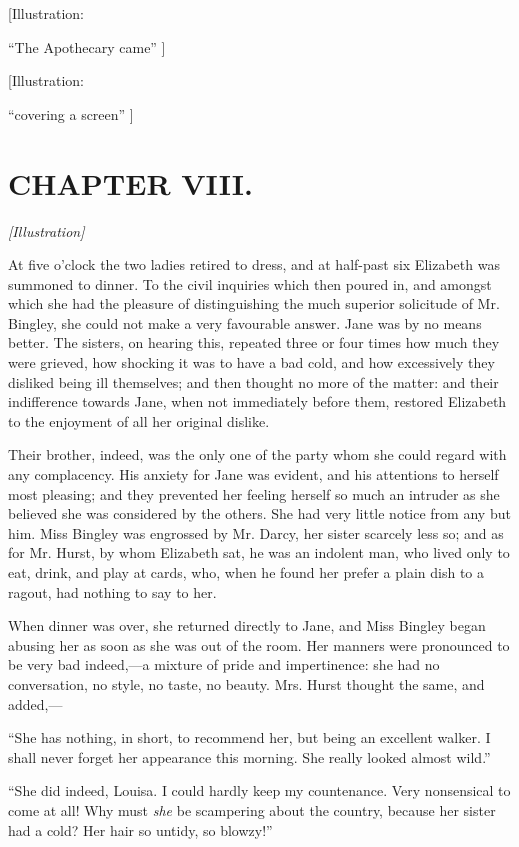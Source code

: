 \documentclass[12pt]{book}
\begin{document}
[Illustration:

``The Apothecary came'' ]

[Illustration:

``covering a screen'' ]

\chapter{CHAPTER VIII.}

\emph{[Illustration]}

At five o'clock the two ladies retired to dress, and at half-past six Elizabeth was summoned to dinner. To the civil inquiries which then poured in, and amongst which she had the pleasure of distinguishing the much superior solicitude of Mr. Bingley, she could not make a very favourable answer. Jane was by no means better. The sisters, on hearing this, repeated three or four times how much they were grieved, how shocking it was to have a bad cold, and how excessively they disliked being ill themselves; and then thought no more of the matter: and their indifference towards Jane, when not immediately before them, restored Elizabeth to the enjoyment of all her original dislike.

Their brother, indeed, was the only one of the party whom she could regard with any complacency. His anxiety for Jane was evident, and his attentions to herself most pleasing; and they prevented her feeling herself so much an intruder as she believed she was considered by the others. She had very little notice from any but him. Miss Bingley was engrossed by Mr. Darcy, her sister scarcely less so; and as for Mr. Hurst, by whom Elizabeth sat, he was an indolent man, who lived only to eat, drink, and play at cards, who, when he found her prefer a plain dish to a ragout, had nothing to say to her.

When dinner was over, she returned directly to Jane, and Miss Bingley began abusing her as soon as she was out of the room. Her manners were pronounced to be very bad indeed,---a mixture of pride and impertinence: she had no conversation, no style, no taste, no beauty. Mrs. Hurst thought the same, and added,---

``She has nothing, in short, to recommend her, but being an excellent walker. I shall never forget her appearance this morning. She really looked almost wild.''

``She did indeed, Louisa. I could hardly keep my countenance. Very nonsensical to come at all! Why must \textit{she} be scampering about the country, because her sister had a cold? Her hair so untidy, so blowzy!''
\end{document}
